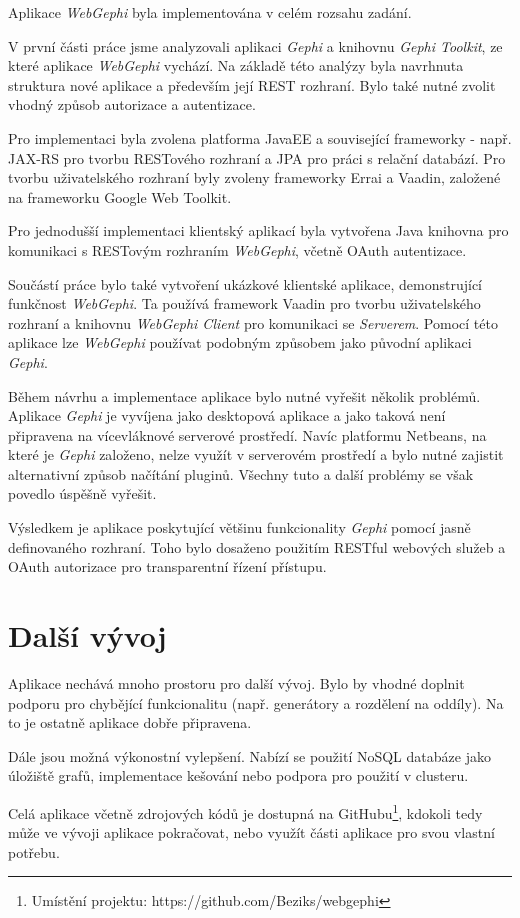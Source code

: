 \documentclass[thesis=M,czech]{FITthesis}[2014/05/6]
\begin{document}
\begin{conclusion}
	Aplikace \textit{WebGephi} byla implementována v celém rozsahu zadání. 
	
	V první části práce jsme analyzovali aplikaci \textit{Gephi} a knihovnu \textit{Gephi Toolkit}, ze které aplikace \textit{WebGephi} vychází.
	Na základě této analýzy byla navrhnuta struktura nové aplikace a především její REST rozhraní. Bylo také nutné zvolit vhodný způsob autorizace a
	autentizace.
	
	Pro implementaci byla zvolena platforma JavaEE a související frameworky - např. JAX-RS pro tvorbu RESTového rozhraní a JPA pro práci s relační databází.
	Pro tvorbu uživatelského rozhraní byly zvoleny frameworky Errai a Vaadin, založené na frameworku Google Web Toolkit.
	
	Pro jednodušší implementaci klientský aplikací byla vytvořena Java knihovna pro komunikaci s RESTovým rozhraním \textit{WebGephi}, včetně OAuth autentizace.
	
	Součástí práce bylo také vytvoření ukázkové klientské aplikace, demonstrující funkčnost \textit{WebGephi}. Ta používá framework Vaadin pro tvorbu uživatelského rozhraní a 
	knihovnu \textit{WebGephi Client} pro komunikaci se \textit{Serverem}. Pomocí této aplikace lze \textit{WebGephi} používat podobným způsobem jako původní aplikaci \textit{Gephi}.
	
	Během návrhu a implementace aplikace bylo nutné vyřešit několik problémů. Aplikace \textit{Gephi} je vyvíjena jako desktopová aplikace a jako taková není 
	připravena na vícevláknové serverové prostředí. Navíc platformu Netbeans, na které je \textit{Gephi} založeno, nelze využít v serverovém prostředí a bylo nutné zajistit 
	alternativní způsob načítání pluginů. Všechny tuto a další problémy se však povedlo úspěšně vyřešit.
	
	Výsledkem je aplikace poskytující většinu funkcionality \textit{Gephi} pomocí jasně definovaného rozhraní. Toho bylo dosaženo použitím RESTful webových služeb a OAuth autorizace 
	pro transparentní řízení přístupu.
	
	\section{Další vývoj}
	Aplikace nechává mnoho prostoru pro další vývoj. Bylo by vhodné doplnit podporu pro chybějící funkcionalitu (např. generátory a rozdělení na oddíly). Na to je ostatně aplikace 
	dobře připravena.
	
	Dále jsou možná výkonostní vylepšení. Nabízí se použití NoSQL databáze jako úložiště grafů, implementace kešování nebo podpora pro použití v clusteru.
	
	Celá aplikace včetně zdrojových kódů je dostupná na GitHubu\footnote{Umístění projektu: https://github.com/Beziks/webgephi}, kdokoli tedy může ve vývoji aplikace pokračovat, 
	nebo využít části aplikace pro svou vlastní potřebu.	
\end{conclusion}
\end{document}
